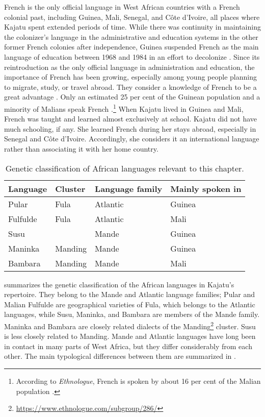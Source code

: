 \documentclass[output=paper]{langscibook}
\begin{document}
French is the only official language in West African countries with a French colonial past, including Guinea, Mali, Senegal, and Côte d’Ivoire, all places where Kajatu spent extended periods of time. While there was continuity in maintaining the colonizer’s language in the administrative and education systems in the other former French colonies after independence, Guinea suspended French as the main language of education between 1968 and 1984 in an effort to decolonize \citep{barry_francais_2014}. Since its reintroduction as the only official language in administration and education, the importance of French has been growing, especially among young people planning to migrate, study, or travel abroad. They consider a knowledge of French to be a great advantage \citep{diallo_quelques_2021}. Only an estimated 25 per cent of the Guinean population and a minority of Malians speak French \citep{cisse_langues_2020}.\footnote{According to \textit{Ethnologue}, French is spoken by about 16 per cent of the Malian population \citep{eberhard_ethnologue_2021}.} When Kajatu lived in Guinea and Mali, French was taught and learned almost exclusively at school. Kajatu did not have much schooling, if any. She learned French during her stays abroad, especially in Senegal and Côte d’Ivoire. Accordingly, she considers it an international language rather than associating it with her home country.

\begin{table}
    \begin{tabular}{llll}\midrule\toprule
        Language & Cluster & Language family & Mainly spoken in \\\midrule
        Pular    & Fula    & Atlantic        & Guinea           \\
        Fulfulde & Fula    & Atlantic        & Mali             \\
        Susu     &         & Mande           & Guinea           \\
        Maninka  & Manding & Mande           & Guinea           \\
        Bambara  & Manding & Mande           & Mali\\ \bottomrule\midrule
    \end{tabular}
    \caption{Genetic classification of African languages relevant to this chapter.}
    \label{fanego:tab:gen_class_afrcn_lngs}
\end{table}

\noindent
{} summarizes the genetic classification of the African languages in Kajatu’s repertoire. They belong to the Mande and Atlantic language families; Pular and Malian Fulfulde are geographical varieties of Fula, which belongs to the Atlantic languages, while Susu, Maninka, and Bambara are members of the Mande family. Maninka and Bambara are closely related dialects of the Manding\footnote{\url{https://www.ethnologue.com/subgroup/286/}}
cluster. Susu is less closely related to Manding. Mande and Atlantic languages have long been in contact in many parts of West Africa, but they differ considerably from each other. The main typological differences between them are summarized in .
\end{document}
